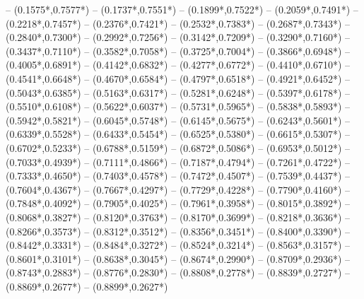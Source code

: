 {	-- ({0.1575*\dx},{0.7577*\dy})
	-- ({0.1737*\dx},{0.7551*\dy})
	-- ({0.1899*\dx},{0.7522*\dy})
	-- ({0.2059*\dx},{0.7491*\dy})
	-- ({0.2218*\dx},{0.7457*\dy})
	-- ({0.2376*\dx},{0.7421*\dy})
	-- ({0.2532*\dx},{0.7383*\dy})
	-- ({0.2687*\dx},{0.7343*\dy})
	-- ({0.2840*\dx},{0.7300*\dy})
	-- ({0.2992*\dx},{0.7256*\dy})
	-- ({0.3142*\dx},{0.7209*\dy})
	-- ({0.3290*\dx},{0.7160*\dy})
	-- ({0.3437*\dx},{0.7110*\dy})
	-- ({0.3582*\dx},{0.7058*\dy})
	-- ({0.3725*\dx},{0.7004*\dy})
	-- ({0.3866*\dx},{0.6948*\dy})
	-- ({0.4005*\dx},{0.6891*\dy})
	-- ({0.4142*\dx},{0.6832*\dy})
	-- ({0.4277*\dx},{0.6772*\dy})
	-- ({0.4410*\dx},{0.6710*\dy})
	-- ({0.4541*\dx},{0.6648*\dy})
	-- ({0.4670*\dx},{0.6584*\dy})
	-- ({0.4797*\dx},{0.6518*\dy})
	-- ({0.4921*\dx},{0.6452*\dy})
	-- ({0.5043*\dx},{0.6385*\dy})
	-- ({0.5163*\dx},{0.6317*\dy})
	-- ({0.5281*\dx},{0.6248*\dy})
	-- ({0.5397*\dx},{0.6178*\dy})
	-- ({0.5510*\dx},{0.6108*\dy})
	-- ({0.5622*\dx},{0.6037*\dy})
	-- ({0.5731*\dx},{0.5965*\dy})
	-- ({0.5838*\dx},{0.5893*\dy})
	-- ({0.5942*\dx},{0.5821*\dy})
	-- ({0.6045*\dx},{0.5748*\dy})
	-- ({0.6145*\dx},{0.5675*\dy})
	-- ({0.6243*\dx},{0.5601*\dy})
	-- ({0.6339*\dx},{0.5528*\dy})
	-- ({0.6433*\dx},{0.5454*\dy})
	-- ({0.6525*\dx},{0.5380*\dy})
	-- ({0.6615*\dx},{0.5307*\dy})
	-- ({0.6702*\dx},{0.5233*\dy})
	-- ({0.6788*\dx},{0.5159*\dy})
	-- ({0.6872*\dx},{0.5086*\dy})
	-- ({0.6953*\dx},{0.5012*\dy})
	-- ({0.7033*\dx},{0.4939*\dy})
	-- ({0.7111*\dx},{0.4866*\dy})
	-- ({0.7187*\dx},{0.4794*\dy})
	-- ({0.7261*\dx},{0.4722*\dy})
	-- ({0.7333*\dx},{0.4650*\dy})
	-- ({0.7403*\dx},{0.4578*\dy})
	-- ({0.7472*\dx},{0.4507*\dy})
	-- ({0.7539*\dx},{0.4437*\dy})
	-- ({0.7604*\dx},{0.4367*\dy})
	-- ({0.7667*\dx},{0.4297*\dy})
	-- ({0.7729*\dx},{0.4228*\dy})
	-- ({0.7790*\dx},{0.4160*\dy})
	-- ({0.7848*\dx},{0.4092*\dy})
	-- ({0.7905*\dx},{0.4025*\dy})
	-- ({0.7961*\dx},{0.3958*\dy})
	-- ({0.8015*\dx},{0.3892*\dy})
	-- ({0.8068*\dx},{0.3827*\dy})
	-- ({0.8120*\dx},{0.3763*\dy})
	-- ({0.8170*\dx},{0.3699*\dy})
	-- ({0.8218*\dx},{0.3636*\dy})
	-- ({0.8266*\dx},{0.3573*\dy})
	-- ({0.8312*\dx},{0.3512*\dy})
	-- ({0.8356*\dx},{0.3451*\dy})
	-- ({0.8400*\dx},{0.3390*\dy})
	-- ({0.8442*\dx},{0.3331*\dy})
	-- ({0.8484*\dx},{0.3272*\dy})
	-- ({0.8524*\dx},{0.3214*\dy})
	-- ({0.8563*\dx},{0.3157*\dy})
	-- ({0.8601*\dx},{0.3101*\dy})
	-- ({0.8638*\dx},{0.3045*\dy})
	-- ({0.8674*\dx},{0.2990*\dy})
	-- ({0.8709*\dx},{0.2936*\dy})
	-- ({0.8743*\dx},{0.2883*\dy})
	-- ({0.8776*\dx},{0.2830*\dy})
	-- ({0.8808*\dx},{0.2778*\dy})
	-- ({0.8839*\dx},{0.2727*\dy})
	-- ({0.8869*\dx},{0.2677*\dy})
	-- ({0.8899*\dx},{0.2627*\dy})
}

